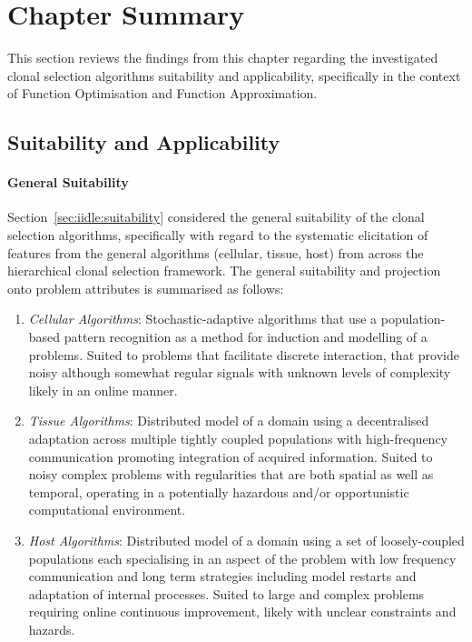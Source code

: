 %
%
\section{Chapter Summary}
\label{sec:iidle:summary}
This section reviews the findings from this chapter regarding the investigated clonal selection algorithms suitability and applicability, specifically in the context of Function Optimisation and Function Approximation.

%
%
\subsection{Suitability and Applicability}

%
%
\paragraph{General Suitability}
Section~\ref{sec:iidle:suitability} considered the general suitability of the clonal selection algorithms, specifically with regard to the systematic elicitation of features from the general algorithms (cellular, tissue, host) from across the hierarchical clonal selection framework. The general suitability and projection onto problem attributes is summarised as follows:

\begin{enumerate}
	\item \emph{Cellular Algorithms}: Stochastic-adaptive algorithms that use a population-based pattern recognition as a method for induction and modelling of a problems. Suited to problems that facilitate discrete interaction, that provide noisy although somewhat regular signals with unknown levels of complexity likely in an online manner.
	\item \emph{Tissue Algorithms}: Distributed model of a domain using a decentralised adaptation across multiple tightly coupled populations with high-frequency communication promoting integration of acquired information. Suited to noisy complex problems with regularities that are both spatial as well as temporal, operating in a potentially hazardous and/or opportunistic computational environment.
	\item \emph{Host Algorithms}: Distributed model of a domain using a set of loosely-coupled populations each specialising in an aspect of the problem with low frequency communication and long term strategies including model restarts and adaptation of internal processes. Suited to large and complex problems requiring online continuous improvement, likely with unclear constraints and hazards. 
\end{enumerate}


